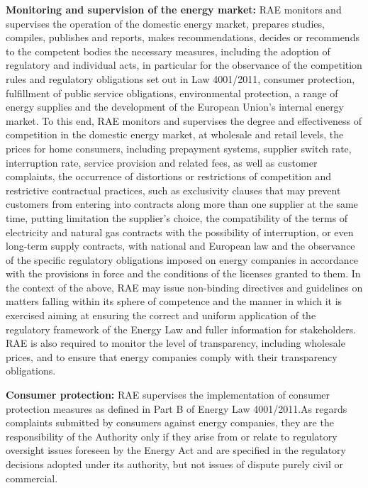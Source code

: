 \begin{itemize}
\item{\textbf{Monitoring and supervision of the energy market:}
RAE monitors and supervises the operation of the domestic energy market, prepares studies, compiles, publishes and reports, makes recommendations, decides or recommends to the competent bodies the necessary measures, including the adoption of regulatory and individual acts, in particular for the observance of the competition rules and regulatory obligations set out in Law 4001/2011, consumer protection, fulfillment of public service obligations, environmental protection, a range of energy supplies and the development of the European Union's internal energy market. To this end, RAE monitors and supervises the degree and effectiveness of competition in the domestic energy market, at wholesale and retail levels, the prices for home consumers, including prepayment systems, supplier switch rate, interruption rate, service provision and related fees, as well as customer complaints, the occurrence of distortions or restrictions of competition and restrictive contractual practices, such as exclusivity clauses that may prevent customers from entering into contracts along more than one supplier at the same time, putting limitation the supplier’s choice, the compatibility of the terms of electricity and natural gas contracts with the possibility of interruption, or even long-term supply contracts, with national and European law and the observance of the specific regulatory obligations imposed on energy companies in accordance with the provisions in force and the conditions of the licenses granted to them. In the context of the above, RAE may issue non-binding directives and guidelines on matters falling within its sphere of competence and the manner in which it is exercised aiming at ensuring the correct and uniform application of the regulatory framework of the Energy Law and fuller information for stakeholders. RAE is also required to monitor the level of transparency, including wholesale prices, and to ensure that energy companies comply with their transparency obligations.
\item{\textbf{Consumer protection:}}
RAE supervises the implementation of consumer protection measures as defined in Part B of Energy Law 4001/2011.As regards complaints submitted by consumers against energy companies, they are the responsibility of the Authority only if they arise from or relate to regulatory oversight issues foreseen by the Energy Act and are specified in the regulatory decisions adopted under its authority, but not issues of dispute purely civil or commercial.
}
\end{itemize}

